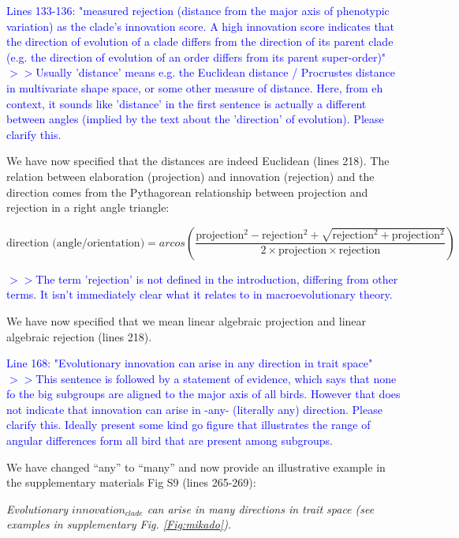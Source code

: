 \documentclass[12pt,letterpaper]{article}
\begin{document}
{\textcolor{blue}{Lines 133-136: "measured rejection (distance from the major axis of phenotypic variation) as the clade’s innovation score. A high innovation score indicates that the direction of evolution of a clade differs from the direction of its parent clade (e.g. the direction of evolution of an order differs from its parent super-order)"
$>>$Usually 'distance' means e.g. the Euclidean distance / Procrustes distance in multivariate shape space, or some other measure of distance. Here, from eh context, it sounds like 'distance' in the first sentence is actually a different between angles (implied by the text about the 'direction' of evolution). Please clarify this.}

We have now specified that the distances are indeed Euclidean (lines 218). The relation between elaboration (projection) and innovation (rejection) and the direction comes from the Pythagorean relationship between projection and rejection in a right angle triangle:

\begin{equation}
\text{direction (angle/orientation)} = arcos\left(\frac{\text{projection}^2 - \text{rejection}^2 + \sqrt{\text{rejection}^2+\text{projection}^2}  }{2\times\text{projection}\times\text{rejection}}\right)
\end{equation}

\textcolor{blue}{$>>$The term 'rejection' is not defined in the introduction, differing from other terms. It isn't immediately clear what it relates to in macroevolutionary theory.}

We have now specified that we mean linear algebraic projection and linear algebraic rejection (lines 218).

\textcolor{blue}{Line 168: "Evolutionary innovation can arise in any direction in trait space"
$>>$This sentence is followed by a statement of evidence, which says that none fo the big subgroups are aligned to the major axis of all birds. However that does not indicate that innovation can arise in -any- (literally any) direction. Please clarify this. Ideally present some kind go figure that illustrates the range of angular differences form all bird that are present among subgroups.}

We have changed “any” to “many” and now provide an illustrative example in the supplementary materials Fig S9 (lines 265-269):

\noindent\textit{Evolutionary $innovation_{clade}$ can arise in many directions in trait space (see examples in supplementary Fig. \ref{Fig:mikado}). %
}

}
\end{document}
